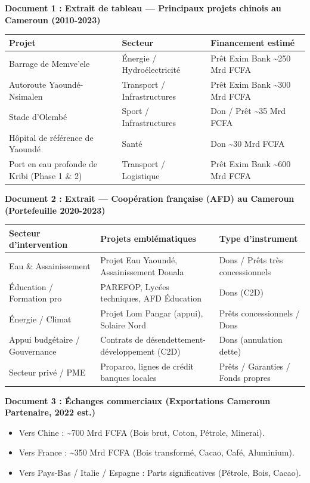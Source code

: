 \documentclass[11pt]{article}
\begin{document}
\begin{exercice}
\textbf{Document 1 : Extrait de tableau — Principaux projets chinois au Cameroun (2010-2023)}
\begin{center}
\begin{tabularx}{\linewidth}{|l|X|l|}
\hline
\textbf{Projet} & \textbf{Secteur} & \textbf{Financement estimé} \\
\hline
Barrage de Memve'ele & Énergie / Hydroélectricité & Prêt Exim Bank \textasciitilde 250 Mrd FCFA \\
\hline
Autoroute Yaoundé-Nsimalen & Transport / Infrastructures & Prêt Exim Bank \textasciitilde 300 Mrd FCFA \\
\hline
Stade d'Olembé & Sport / Infrastructures & Don / Prêt \textasciitilde 35 Mrd FCFA \\
\hline
Hôpital de référence de Yaoundé & Santé & Don \textasciitilde 30 Mrd FCFA \\
\hline
Port en eau profonde de Kribi (Phase 1 \& 2) & Transport / Logistique & Prêt Exim Bank \textasciitilde 600 Mrd FCFA \\
\hline
\end{tabularx}
\end{center}

\textbf{Document 2 : Extrait — Coopération française (AFD) au Cameroun (Portefeuille 2020-2023)}
\begin{center}
\begin{tabularx}{\linewidth}{|l|X|l|}
\hline
\textbf{Secteur d'intervention} & \textbf{Projets emblématiques} & \textbf{Type d'instrument} \\
\hline
Eau \& Assainissement & Projet Eau Yaoundé, Assainissement Douala & Dons / Prêts très concessionnels \\
\hline
Éducation / Formation pro & PAREFOP, Lycées techniques, AFD Éducation & Dons (C2D) \\
\hline
Énergie / Climat & Projet Lom Pangar (appui), Solaire Nord & Prêts concessionnels / Dons \\
\hline
Appui budgétaire / Gouvernance & Contrats de désendettement-développement (C2D) & Dons (annulation dette) \\
\hline
Secteur privé / PME & Proparco, lignes de crédit banques locales & Prêts / Garanties / Fonds propres \\
\hline
\end{tabularx}
\end{center}

\textbf{Document 3 : Échanges commerciaux (Exportations Cameroun \textrightarrow Partenaire, 2022 est.)}
\begin{itemize}
\item Vers Chine : \textasciitilde 700 Mrd FCFA (Bois brut, Coton, Pétrole, Minerai).
\item Vers France : \textasciitilde 350 Mrd FCFA (Bois transformé, Cacao, Café, Aluminium).
\item Vers Pays-Bas / Italie / Espagne : Parts significatives (Pétrole, Bois, Cacao).
\end{itemize}


\end{exercice}
\end{document}
